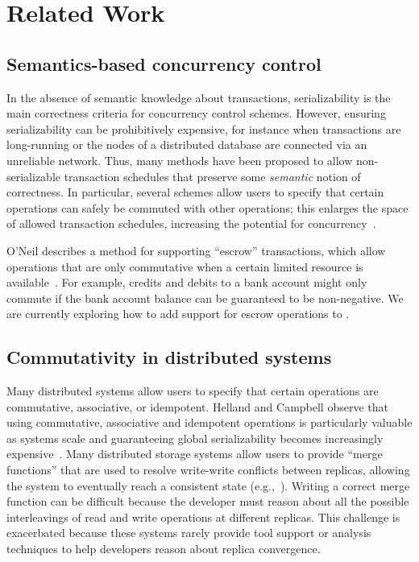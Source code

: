 \section{Related Work}
\label{sec:relwork}


\subsection{Semantics-based concurrency control}
In the absence of semantic knowledge about transactions, serializability is the
main correctness criteria for concurrency control schemes. However, ensuring
serializability can be prohibitively expensive, for instance when transactions
are long-running or the nodes of a distributed database are connected via an
unreliable network. Thus, many methods have been proposed to allow
non-serializable transaction schedules that preserve some \emph{semantic} notion
of correctness. In particular, several schemes allow users to specify that
certain operations can safely be commuted with other operations; this enlarges
the space of allowed transaction schedules, increasing the potential for
concurrency~\cite{Farrag1989,Garcia-Molina1983,Weihl1988}.


O'Neil describes a method for supporting ``escrow'' transactions, which allow
operations that are only commutative when a certain limited resource is
available~\cite{O'Neil1986}. For example, credits and debits to a bank account
might only commute if the bank account balance can be guaranteed to be
non-negative. We are currently exploring how to add support for escrow
operations to \lang.


\subsection{Commutativity in distributed systems}
Many distributed systems allow users to specify that certain operations are
commutative, associative, or idempotent. Helland and Campbell observe that using
commutative, associative and idempotent operations is particularly valuable as
systems scale and guaranteeing global serializability becomes increasingly
expensive~\cite{Helland2009}. Many distributed storage systems allow users to
provide ``merge functions'' that are used to resolve write-write conflicts
between replicas, allowing the system to eventually reach a consistent state
(e.g.,~\cite{DeCandia2007,statebox,Lloyd2011,Power2010,Terry1995}).%
Writing a correct merge function can be difficult because the developer must
reason about all the possible interleavings of read and write operations at
different replicas. This challenge is exacerbated because these systems rarely
provide tool support or analysis techniques to help developers reason about
replica convergence.

